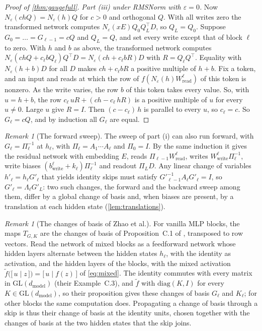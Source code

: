 \documentclass[10pt]{article}
\theoremstyle{definition}
\theoremstyle{remark}
\newtheorem{remark}[theorem]{Remark}
\newcommand{\Wread}{W_{\mathrm{read}}}
\newcommand{\Wwrite}{W_{\mathrm{write}}}
\newcommand{\dm}{d_{\mathrm{model}}}
\newcommand{\GL}{\mathrm{GL}}
\begin{document}
\begin{proof}[Proof of \cref{thm:gaugefull}]
\emph{Part (iii) under RMSNorm with $\varepsilon = 0$.} Now $N_\varepsilon(chQ) = N_\varepsilon(h)Q$ for $c > 0$ and orthogonal $Q$. With all writes zero the transformed network computes $N_\varepsilon(xE)Q_0Q_L^\top D$, so $Q_L = Q_0$. Suppose $G_0 = \dots = G_{\ell-1} = cQ$ and $Q_L = Q$, and set every write except that of block $\ell$ to zero. With $h$ and $b$ as above, the transformed network computes $N_\varepsilon(chQ + c_\ell bQ_\ell)Q^\top D = N_\varepsilon(ch + c_\ell bR)D$ with $R = Q_\ell Q^\top$. Equality with $N_\varepsilon(h + b)D$ for all $D$ makes $ch + c_\ell bR$ a positive multiple of $h + b$. Fix a token, and an input and reads at which the row of $f(N_\varepsilon(h)\Wread^{\ell})$ of this token is nonzero. As the write varies, the row $b$ of this token takes every value. So, with $u = h + b$, the row $c_\ell\,uR + (ch - c_\ell\,hR)$ is a positive multiple of $u$ for every $u \neq 0$. Large $u$ give $R = I$. Then $(c - c_\ell)\,h$ is parallel to every $u$, so $c_\ell = c$. So $G_\ell = cQ$, and by induction all $G_\ell$ are equal.
\end{proof}

\begin{remark}[The forward sweep]\label{rem:forward}
The sweep of part (i) can also run forward, with $G_\ell = \Pi_\ell^{-1}$ at $h_\ell$, with $\Pi_\ell = A_1\cdots A_\ell$ and $\Pi_0 = I$. By the same induction it gives the residual network with embedding $E$, reads $\Pi_{\ell-1}\Wread^{\ell}$, writes $\Wwrite^{\ell}\Pi_\ell^{-1}$, write biases $(b^{\ell}_{\mathrm{write}} + k_\ell)\Pi_\ell^{-1}$ and readout $\Pi_LD$. Any linear change of variables $h'_\ell = h_\ell G'_\ell$ that yields identity skips must satisfy $G'^{-1}_{\ell-1}A_\ell G'_\ell = I$, so $G'_\ell = \Lambda_\ell G'_L$: two such changes, the forward and the backward sweep among them, differ by a global change of basis and, when biases are present, by a translation at each hidden state (\cref{lem:translations}).
\end{remark}

\begin{remark}[The changes of basis of Zhao et al.]\label{rem:zhao}
For vanilla MLP blocks, the maps $T_{G,K}$ are the changes of basis of Proposition~C.1 of \citet{zhao2023symmetries}, transposed to row vectors. Read the network of mixed blocks as a feedforward network whose hidden layers alternate between the hidden states $h_\ell$, with the identity as activation, and the hidden layers of the blocks, with the mixed activation $\tilde f\big(\big[\, u \;\big|\; z \,\big]\big) = \big[\, u \;\big|\; f(z) \,\big]$ of \cref{eq:mixed}. The identity commutes with every matrix in $\GL(\dm)$ (their Example~C.3), and $\tilde f$ with $\mathrm{diag}(K, I)$ for every $K \in \GL(\dm)$, so their proposition gives these changes of basis $G_\ell$ and $K_\ell$; for other blocks the same computation does. Propagating a change of basis through a skip is thus their change of basis at the identity units, chosen together with the changes of basis at the two hidden states that the skip joins.
\end{remark}
\end{document}

